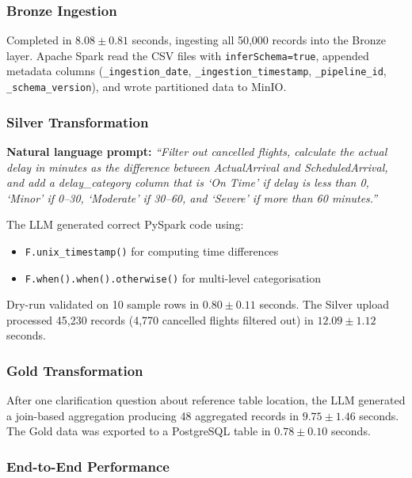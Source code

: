 \documentclass[12pt, a4paper]{article}
\begin{document}
\subsubsection{Bronze Ingestion}
Completed in $8.08 \pm 0.81$ seconds, ingesting all 50,000 records into the Bronze layer. Apache Spark read the CSV files with \texttt{inferSchema=true}, appended metadata columns (\texttt{\_ingestion\_date}, \texttt{\_ingestion\_timestamp}, \texttt{\_pipeline\_id}, \texttt{\_schema\_version}), and wrote partitioned data to MinIO.

\subsubsection{Silver Transformation}
\textbf{Natural language prompt:} \textit{``Filter out cancelled flights, calculate the actual delay in minutes as the difference between ActualArrival and ScheduledArrival, and add a delay\_category column that is `On Time' if delay is less than 0, `Minor' if 0--30, `Moderate' if 30--60, and `Severe' if more than 60 minutes.''}

The LLM generated correct PySpark code using:
\begin{itemize}
    \item \texttt{F.unix\_timestamp()} for computing time differences
    \item \texttt{F.when().when().otherwise()} for multi-level categorisation
\end{itemize}

Dry-run validated on 10 sample rows in $0.80 \pm 0.11$ seconds. The Silver upload processed 45,230 records (4,770 cancelled flights filtered out) in $12.09 \pm 1.12$ seconds.

\subsubsection{Gold Transformation}
After one clarification question about reference table location, the LLM generated a join-based aggregation producing 48 aggregated records in $9.75 \pm 1.46$ seconds. The Gold data was exported to a PostgreSQL table in $0.78 \pm 0.10$ seconds.

\subsubsection{End-to-End Performance}
\begin{center}
\end{center}
\end{document}
